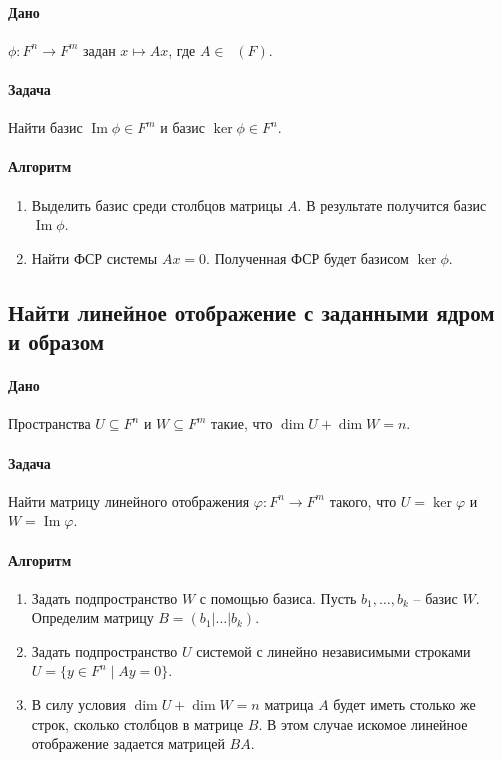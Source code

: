 \documentclass{article}
\newcommand{\MatrixDim}[3]{\mathop{\mathrm{M}_{#2\,#3}}(#1)}
\renewcommand{\Im}{\operatorname{Im}}
\begin{document}
\paragraph{Дано} $\phi\colon F^{n}\to F^{m}$ задан $x\mapsto Ax$, где $A\in\MatrixDim{F}{m}{n}$.

\paragraph{Задача} Найти базис $\Im \phi\in F^{m}$ и базис $\ker \phi\in F^{n}$.

\paragraph{Алгоритм}
\begin{enumerate}
\item Выделить базис среди столбцов матрицы $A$. В результате получится базис $\Im \phi$.

\item Найти ФСР системы $Ax = 0$. Полученная ФСР будет базисом $\ker \phi$.
\end{enumerate}

\subsection{Найти линейное отображение с заданными ядром и образом}

\paragraph{Дано} Пространства $U\subseteq F^n$ и $W \subseteq F^m$ такие, что $\dim U + \dim W = n$.

\paragraph{Задача} Найти матрицу линейного отображения $\varphi \colon F^n \to F^m$ такого, что $U = \ker \varphi$ и $W = \Im \varphi$.

\paragraph{Алгоритм}
\begin{enumerate}
\item Задать подпространство $W$ с помощью базиса. Пусть $b_1,\ldots,b_k$ -- базис $W$. Определим матрицу $B = (b_1 |\ldots |b_k)$.

\item Задать подпространство $U$ системой с линейно независимыми строками $U = \{y\in F^n \mid A y = 0\}$.

\item В силу условия $\dim U + \dim W = n$ матрица $A$ будет иметь столько же строк, сколько столбцов в матрице $B$. В этом случае искомое линейное отображение задается матрицей $BA$.
\end{enumerate}
\end{document}
